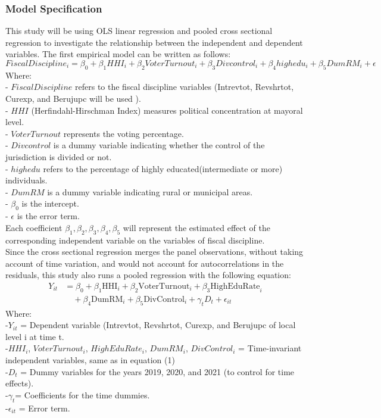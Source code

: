 \subsubsection{Model Specification}
This study will be using OLS linear regression and pooled cross sectional regression to investigate the relationship between the independent and dependent variables. The first empirical model can be written as follows:
\begin{equation}
FiscalDiscipline_i = \beta_0 + \beta_1 HHI_i + \beta_2 VoterTurnout_i + \beta_3 Divcontrol_i+  \beta_4 highedu _i+ \beta_5 DumRM_i + \epsilon
\end{equation}
Where:\\
- \(FiscalDiscipline\) refers to the fiscal discipline variables (Intrevtot, Revshrtot, Curexp, and Berujupc will be used ).\\
- \(HHI\) (Herfindahl-Hirschman Index) measures political concentration at mayoral level.\\
- \(VoterTurnout\) represents the voting percentage.\\
- \(Divcontrol\) is a dummy variable indicating whether the control of the jurisdiction is divided or not.\\
- \(highedu\) refers to the percentage of highly educated(intermediate or more) individuals.\\
- \(DumRM\) is a dummy variable indicating rural or municipal areas.\\
- \(\beta_0\) is the intercept.\\
- \(\epsilon\) is the error term.\\
Each coefficient \(\beta_1, \beta_2, \beta_3, \beta_4, \beta_5\) will represent the estimated effect of the corresponding independent variable on the variables of fiscal discipline.\\
Since the cross sectional regression merges the panel observations, without taking account of time variation, and would not account for autocorrelations in the residuals, this study also runs a pooled regression with the following equation:
\begin{align}
Y_{it} & = \beta_0 + \beta_1 \text{HHI}_i + \beta_2 \text{VoterTurnout}_i + \beta_3 \text{HighEduRate}_i \nonumber \\ &\quad + \beta_4 \text{DumRM}_i + \beta_5 \text{DivControl}_i + \gamma_t D_t + \epsilon_{it} 
\end{align}
Where:\\
-\(Y_{it}\) = Dependent variable (Intrevtot, Revshrtot, Curexp, and Berujupc of local level  i at time  t.\\
-\(HHI_{i}\), \(VoterTurnout_{i}\), \(HighEduRate_{i}\), \(DumRM_{i}\), \(DivControl_{i}\) = Time-invariant independent variables, same as in equation (1)\\
-\(D_t\) = Dummy variables for the years 2019, 2020, and 2021 (to control for time effects).\\
-\(\gamma_t \)= Coefficients for the time dummies.\\
-\(\epsilon_{it}\) = Error term.

